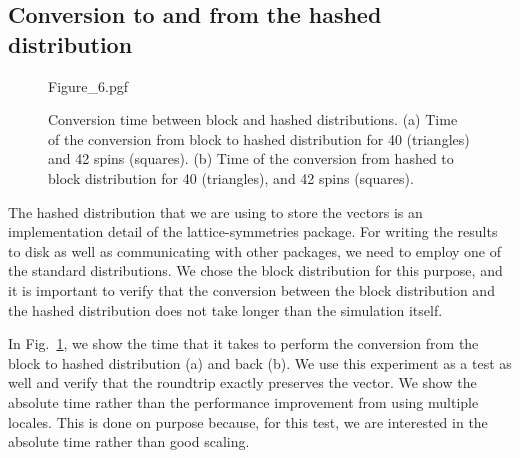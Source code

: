 \subsection{Conversion to and from the hashed distribution}

\begin{figure}
  \centering
  {Figure_6.pgf}
  \caption{Conversion time between block and hashed distributions. (a) Time of the conversion from block to hashed distribution for 40 (triangles) and 42 spins (squares). (b) Time of the conversion from hashed to block distribution for 40 (triangles), and 42 spins (squares).}
  \label{fig:ls23:blockHashed}
\end{figure}



The hashed distribution that we are using to store the vectors is an implementation detail of the lattice-symmetries package. For writing the results to disk as well as communicating with other packages, we need to employ one of the standard distributions. We chose the block distribution for this purpose, and it is important to verify that the conversion between the block distribution and the hashed distribution does not take longer than the simulation itself.

In Fig.~\ref{fig:ls23:blockHashed}, we show the time that it takes to perform the conversion from the block to hashed distribution (a) and back (b). We use this experiment as a test as well and verify that the roundtrip exactly preserves the vector. We show the absolute time rather than the performance improvement from using multiple locales. This is done on purpose because, for this test, we are interested in the absolute time rather than good scaling.

